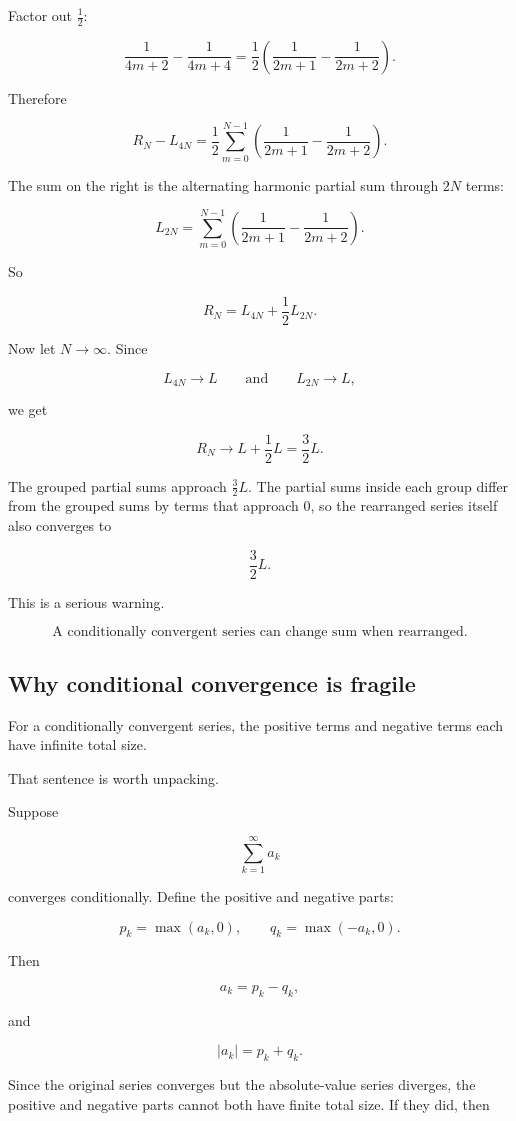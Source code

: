 Factor out \(\frac12\):

\[
\frac1{4m+2}-\frac1{4m+4}
=
\frac12
\left(
\frac1{2m+1}
-
\frac1{2m+2}
\right).
\]

Therefore

\[
R_N-L_{4N}
=
\frac12
\sum_{m=0}^{N-1}
\left(
\frac1{2m+1}
-
\frac1{2m+2}
\right).
\]

The sum on the right is the alternating harmonic partial sum through \(2N\) terms:

\[
L_{2N}
=
\sum_{m=0}^{N-1}
\left(
\frac1{2m+1}
-
\frac1{2m+2}
\right).
\]

So

\[
R_N=L_{4N}+\frac12 L_{2N}.
\]

Now let \(N\to\infty\).  Since

\[
L_{4N}\to L
\qquad\text{and}\qquad
L_{2N}\to L,
\]

we get

\[
R_N\to L+\frac12L=\frac32L.
\]

The grouped partial sums approach \(\frac32L\).  The partial sums inside each group
differ from the grouped sums by terms that approach \(0\), so the rearranged series
itself also converges to

\[
\boxed{
\frac32L.
}
\]

This is a serious warning.

\[
\boxed{
\text{A conditionally convergent series can change sum when rearranged.}
}
\]

\subsection{Why conditional convergence is fragile}
\label{subsec:why-conditional-convergence-fragile}

For a conditionally convergent series, the positive terms and negative terms each have
infinite total size.

That sentence is worth unpacking.

Suppose

\[
\sum_{k=1}^{\infty}a_k
\]

converges conditionally.  Define the positive and negative parts:

\[
p_k=\max(a_k,0),
\qquad
q_k=\max(-a_k,0).
\]

Then

\[
a_k=p_k-q_k,
\]

and

\[
|a_k|=p_k+q_k.
\]

Since the original series converges but the absolute-value series diverges, the positive
and negative parts cannot both have finite total size.  If they did, then

